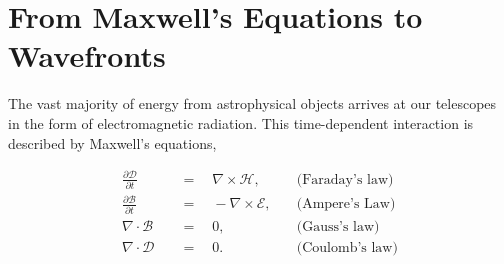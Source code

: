 \documentclass[letterpaper]{ar-1col}
\begin{document}
\printnomenclature


\section{From Maxwell's Equations to Wavefronts}\label{sec:maxwell}
The vast majority of energy from astrophysical objects arrives at our telescopes in the form of electromagnetic radiation.
%
%
This time-dependent interaction is described by Maxwell's equations,

\begin{equation}
\begin{aligned}
\frac{\partial\mathcal{D}}{\partial t} \quad & = \quad \nabla\times\mathcal{H},   & \quad \text{(Faraday's law)} \\[5pt]
\frac{\partial\mathcal{B}}{\partial t} \quad & = \quad -\nabla\times\mathcal{E},  & \quad \text{(Ampere's Law)}   \\[5pt]
\nabla\cdot\mathcal{B}                 \quad & = \quad 0,                         & \quad \text{(Gauss's law)}   \\[5pt]
\nabla\cdot\mathcal{D}                 \quad & = \quad 0.                         & \quad \text{(Coulomb's law)}
\end{aligned}
\end{equation}
\end{document}
